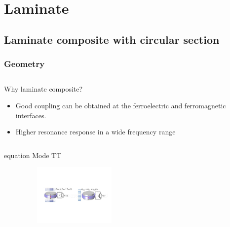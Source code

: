 \documentclass[compress]{beamer}
\begin{document}
\section{Laminate}
\subsection{Laminate composite with circular section}

\begin{frame}\frametitle{Geometry}
\begin{columns}[totalwidth=\textwidth] 
	\begin{column}{.68\textwidth}  
	\begin{exampleblock}{Why laminate composite?}
	 \begin{itemize} [label=$\boxed{\checkmark}$, font=\small, leftmargin=*]
	 \item Good coupling can be obtained at the ferroelectric and ferromagnetic interfaces.
	 \item Higher resonance response in a wide frequency range
	 \end{itemize}
	\end{exampleblock}
	\end{column}
	\begin{column}{.3\textwidth}  
	\end{column}
	\end{columns}
\vspace{0.3cm}	
\begin{columns}[totalwidth=\textwidth]
   \begin{column}{.49\textwidth}
       \begin{beamercolorbox}[sep=8pt,center]{equation}
      Mode TT 
      \end{beamercolorbox}
\centering \includegraphics[height=3cm,width=0.9\textwidth]{Graphic/03_circuitTT.pdf}
   \end{column}
   \begin{column}{.49\textwidth}

\end{column}
\end{columns}
\end{frame}
\end{document}
